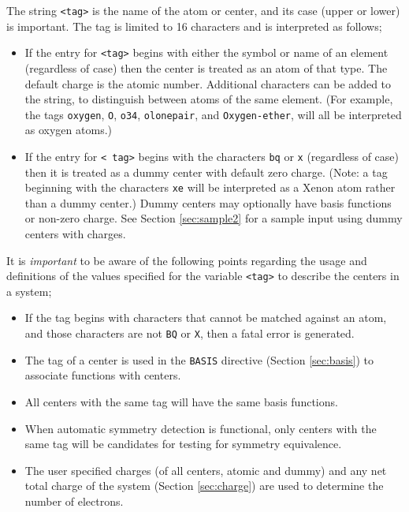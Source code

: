 The string \verb+<tag>+ is the name of the atom or center, and its case
(upper or lower) is important.  The tag is limited to 16 characters
and is interpreted as follows;
\begin{itemize}
\item If the entry for \verb+<tag>+ begins with either the symbol or name of an element
  (regardless of case) then the center is treated as an atom of that type.
  The default charge is the atomic number. 
  Additional characters can
  be added to the string, to distinguish between atoms of the same element.
  (For example, the tags \verb+oxygen+, \verb+O+, \verb+o34+, \verb+olonepair+,
  and \verb+Oxygen-ether+, will all be interpreted as oxygen
  atoms.)
\item If the entry for \verb+< tag>+ begins with the characters \verb+bq+ or \verb+x+
  (regardless of case) then it is treated as a dummy center with
  default zero charge.  (Note: a tag beginning with the characters \verb+xe+
  will be interpreted as a Xenon atom rather than a dummy center.)
  Dummy centers may optionally have basis
  functions or non-zero charge.
  See Section \ref{sec:sample2} for
  a sample input using dummy centers with charges.
\end{itemize}

It is {\em important} to be aware of the following points regarding the
usage and definitions of the values specified for the variable \verb+<tag>+
to describe the centers in a system;
\begin{itemize}
\item If the tag begins with characters that cannot be
    matched against an atom, and those characters are not \verb+BQ+ 
    or \verb+X+, then a fatal
    error is generated.
\item The tag of a center is used in the \verb+BASIS+ directive (Section
\ref{sec:basis}) to associate functions with centers.  
\item All centers with the same tag will have the same basis
functions.
\item When automatic symmetry detection is functional, only centers
with the same tag will be candidates for testing for symmetry
equivalence.
\item The user specified charges (of all centers, atomic and dummy)
and any net total charge of the system (Section \ref{sec:charge}) are
used to determine the number of electrons.
\end{itemize}

